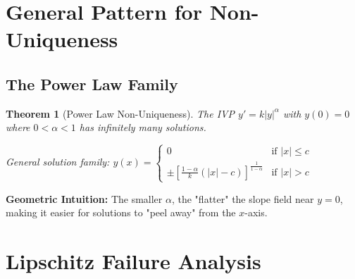 \documentclass[12pt]{article}
\newtheorem{theorem}{Theorem}
\begin{document}
\begin{center}
\end{center}

\section{General Pattern for Non-Uniqueness}

\subsection{The Power Law Family}

\begin{theorem}[Power Law Non-Uniqueness]
The IVP $y' = k|y|^\alpha$ with $y(0) = 0$ where $0 < \alpha < 1$ has infinitely many solutions.

General solution family:
$y(x) = \begin{cases}
    0 & \text{if } |x| \leq c \\
    \pm\left[\frac{1-\alpha}{k}(|x|-c)\right]^{\frac{1}{1-\alpha}} & \text{if } |x| > c
\end{cases}$
\end{theorem}

\begin{insight}
\textbf{Geometric Intuition:} The smaller $\alpha$, the "flatter" the slope field near $y = 0$, making it easier for solutions to "peel away" from the $x$-axis.
\end{insight}

\section{Lipschitz Failure Analysis}
\end{document}

